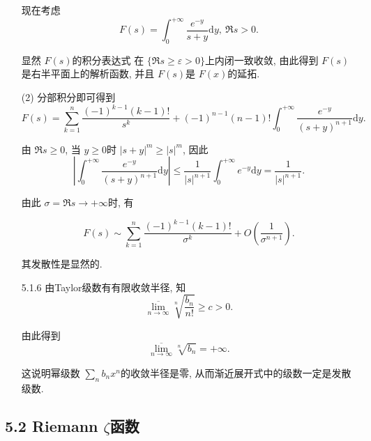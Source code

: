\begin{itemize}
现在考虑
$$F(s) = \int_{0}^{+\infty}\frac{e^{-y}}{s+y}\mathrm{d}y, \ \Re s>0.$$

显然 $F(s)$的积分表达式 在 $\{\Re s\ge \varepsilon>0\}$上内闭一致收敛, 
由此得到 $F(s)$是右半平面上的解析函数, 并且 $F(s)$是 $F(x)$的延拓.

(2) 分部积分即可得到
 $$F(s) = \sum_{k=1}^n\frac{(-1)^{k-1}(k-1)!}{s^k}
 + (-1)^{n-1}(n-1)! \int_0^{+\infty}\frac{e^{-y}}{(s+y)^{n+1}}\mathrm{d}y. $$

 由 $\Re s\ge 0$, 当 $y\ge 0$时 $|s+y|^m\ge |s|^m$, 因此
$$\left| \int_0^{+\infty}\frac{e^{-y}}{(s+y)^{n+1}}\mathrm{d}y \right| 
\le \frac{1}{|s|^{n+1}}\int_0^{+\infty}e^{-y}\mathrm{d}y 
=  \frac{1}{|s|^{n+1}}.$$

由此 $\sigma =\Re s \to +\infty$时, 有

$$F(s) \sim \sum_{k=1}^n\frac{(-1)^{k-1}(k-1)!}{\sigma^k}
+ O\left( \frac{1}{\sigma^{n+1}} \right). $$

其发散性是显然的.

    \item[5.1.6] 由Taylor级数有有限收敛半径, 知
$$\overline{\lim_{n \to \infty}} \sqrt[n]{\frac{b_n}{n!}}\ge c>0.$$

由此得到
$$\overline{\lim_{n \to \infty}} \sqrt[n]{b_n}=+\infty.$$

这说明幂级数 $\sum_n b_n x^n$的收敛半径是零, 从而渐近展开式中的级数一定是发散级数.
\end{itemize} 

\subsection*{5.2 Riemann $\zeta$函数}

